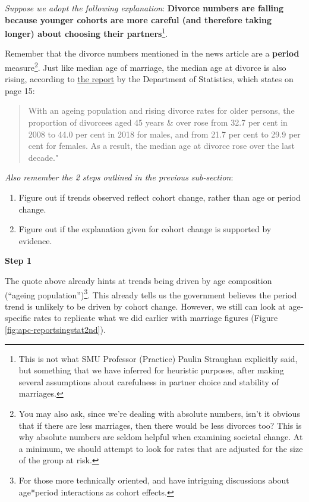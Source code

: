 \documentclass[
  openany]{book}
\providecommand{\tightlist}{%
  \setlength{\itemsep}{0pt}\setlength{\parskip}{0pt}}
\begin{document}
\emph{Suppose we adopt the following explanation}: \textbf{Divorce numbers are falling because younger cohorts are more careful (and therefore taking longer) about choosing their partners}\footnote{This is not what SMU Professor (Practice) Paulin Straughan explicitly said, but something that we have inferred for heuristic purposes, after making several assumptions about carefulness in partner choice and stability of marriages.}.

Remember that the divorce numbers mentioned in the news article are a \textbf{period} measure\footnote{You may also ask, since we're dealing with absolute numbers, isn't it obvious that if there are less marriages, then there would be less divorces too? This is why absolute numbers are seldom helpful when examining societal change. At a minimum, we should attempt to look for rates that are adjusted for the size of the group at risk.}. Just like median age of marriage, the median age at divorce is also rising, according to \href{https://www.singstat.gov.sg/-/media/files/publications/population/smd2018.pdf}{the report} by the Department of Statistics, which states on page 15:

\begin{quote}
With an ageing population and rising divorce rates for older persons, the proportion of divorcees aged 45 years \& over rose from 32.7 per cent in 2008 to 44.0 per cent in 2018 for males, and from 21.7 per cent to 29.9 per cent for females. As a result, the median age at divorce rose over the last decade."
\end{quote}

\emph{Also remember the 2 steps outlined in the previous sub-section}:

\begin{enumerate}
\def\labelenumi{\arabic{enumi}.}
\tightlist
\item
  Figure out if trends observed reflect cohort change, rather than age or period change.
\item
  Figure out if the explanation given for cohort change is supported by evidence.
\end{enumerate}

\textbf{Step 1}

The quote above already hints at trends being driven by age composition (``ageing population'')\footnote{For those more technically oriented, \citet{martin_comment:_2009} and \citet{luo_age-period-cohort-interaction_2020} have intriguing discussions about age*period interactions as cohort effects.}. This already tells us the government believes the period trend is unlikely to be driven by cohort change. However, we still can look at age-specific rates to replicate what we did earlier with marriage figures (Figure \ref{fig:apc-reportsingstat2nd}).
\end{document}
